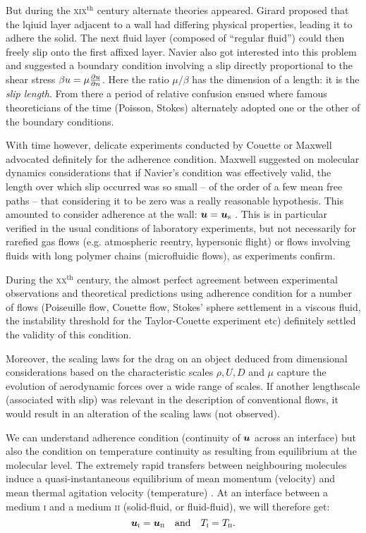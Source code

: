 But during the \textsc{xix}$^\text{th}$ century alternate theories appeared. Girard proposed that the lqiuid layer adjacent to a wall had differing physical properties, leading it to adhere the solid. The next fluid layer (composed of ``regular fluid'') could then freely slip onto the first affixed layer. Navier also got interested into this problem and suggested a boundary condition involving a slip directly proportional to the shear stress $\beta u = \mu \frac{\partial u}{\partial n}$. Here the ratio $\mu/\beta$ has the dimension of a length: it is the \textit{slip length}. From there a period of relative confusion ensued where famous theoreticians of the time (Poisson, Stokes) alternately adopted one or the other of the boundary conditions.

With time however, delicate experiments conducted by Couette or Maxwell advocated definitely for the adherence condition. Maxwell suggested on molecular dynamics considerations that if Navier's condition was effectively valid, the length over which slip occurred was so small -- of the order of a few mean free paths -- that considering it to be zero was a really reasonable hypothesis. This amounted to consider adherence at the wall: $\bu = \bu_\text s$ \citep{Maxwell1879}. This is in particular verified in the usual conditions of laboratory experiments, but not necessarily for rarefied gas flows (e.g. atmospheric reentry, hypersonic flight) or flows involving fluids with long polymer chains (microfluidic flows), as experiments confirm.

During the \textsc{xx}$^\text{th}$ century, the almost perfect agreement between experimental observations and theoretical predictions using adherence condition for a number of flows (Poiseuille flow, Couette flow, Stokes' sphere settlement in a viscous fluid, the instability threshold for the Taylor-Couette experiment etc) definitely settled the validity of this condition.

Moreover, the scaling laws for the drag on an object deduced from dimensional considerations based on the characteristic scales $\rho, U, D$ and $\mu$ capture the evolution of aerodynamic forces over a wide range of scales. If another lengthscale (associated with slip) was relevant in the description of conventional flows, it would result in an alteration of the scaling laws (not observed).

We can understand adherence condition (continuity of $\bu$ across an interface) but also the condition on temperature continuity as resulting from equilibrium at the molecular level. The extremely rapid transfers between neighbouring molecules induce a quasi-instantaneous equilibrium of mean momentum (velocity) and mean thermal agitation velocity (temperature) \citep{Batchelor1967}. At an interface between a medium \textsc{i} and a medium \textsc{ii} (solid-fluid, or fluid-fluid), we will therefore get:
\begin{equation}
\bu_\text{\textsc{i}} = \bu_\text{\textsc{ii}} \quad \text{and} \quad T_\text{\textsc{i}} = T_\text{\textsc{ii}}.
\end{equation}

